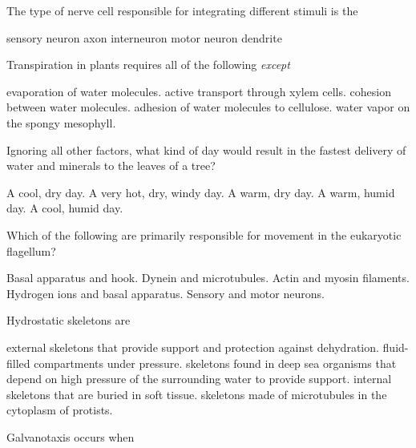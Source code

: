 
\question
The type of nerve cell responsible for integrating different stimuli is the 

\begin{choices}
\choice sensory neuron 
\choice axon 
\correctchoice interneuron 
\choice motor neuron 
\choice dendrite 
\end{choices}

\question
Transpiration in plants requires all of the following \emph{except}

\begin{choices}
\choice evaporation of water molecules. 
\correctchoice active transport through xylem cells. 
\choice cohesion between water molecules.  
\choice adhesion of water molecules to cellulose. 
\choice water vapor on the spongy mesophyll. 
\end{choices}

\question
Ignoring all other factors, what kind of day would result in the fastest delivery of water and minerals to the leaves of a tree?

\begin{choices}
\choice A cool, dry day. 
\choice A very hot, dry, windy day. 
\correctchoice A warm, dry day. 
\choice A warm, humid day.  
\choice A cool, humid day. 
\end{choices}

\question
Which of the following are primarily responsible for movement in the eukaryotic flagellum?

\begin{choices}
\choice Basal apparatus and hook. 
\correctchoice Dynein and microtubules. 
\choice Actin and myosin filaments.  
\choice Hydrogen ions and basal apparatus. 
\choice Sensory and motor neurons. 
\end{choices}

\question
Hydrostatic skeletons are 

\begin{choices}
\choice external skeletons that provide support and protection against dehydration. 
\correctchoice fluid-filled compartments under pressure. 
\choice skeletons found in deep sea organisms that depend on high pressure of the surrounding water to provide support. 
\choice internal skeletons that are buried in soft tissue.  
\choice skeletons made of microtubules in the cytoplasm of protists. 
\end{choices}

\newpage

\question
Galvanotaxis occurs when 

